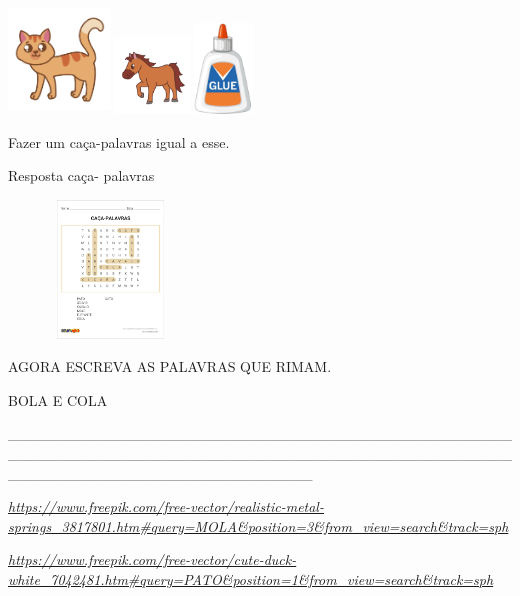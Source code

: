 \includegraphics[width=1.07569in,height=1.14514in]{media/image34.png}\includegraphics[width=0.85069in,height=0.80069in]{media/image35.png}\includegraphics[width=0.63333in,height=0.94653in]{media/image36.png}

Fazer um caça-palavras igual a esse.

Resposta caça- palavras

\includegraphics[width=2.13750in,height=1.44792in]{media/image37.jpg}

AGORA ESCREVA AS PALAVRAS QUE RIMAM.

BOLA E COLA

\_\_\_\_\_\_\_\_\_\_\_\_\_\_\_\_\_\_\_\_\_\_\_\_\_\_\_\_\_\_\_\_\_\_\_\_\_\_\_\_\_\_\_\_\_\_\_\_\_\_\_\_\_\_\_\_\_\_\_\_\_\_\_\_\_\_\_\_\_\_\_\_\_\_\_\_\_\_\_\_\_\_\_\_\_\_\_\_\_\_\_\_\_\_\_\_\_\_\_\_\_\_\_\_\_\_\_\_\_\_\_\_\_\_\_\_\_\_\_\_\_\_\_\_\_

\href{https://www.freepik.com/free-vector/realistic-metal-springs_3817801.htm\#query=MOLA\&position=3\&from_view=search\&track=sph}{\emph{https://www.freepik.com/free-vector/realistic-metal-springs\_3817801.htm\#query=MOLA\&position=3\&from\_view=search\&track=sph}}

\href{https://www.freepik.com/free-vector/cute-duck-white_7042481.htm\#query=PATO\&position=1\&from_view=search\&track=sph}{\emph{https://www.freepik.com/free-vector/cute-duck-white\_7042481.htm\#query=PATO\&position=1\&from\_view=search\&track=sph}}


